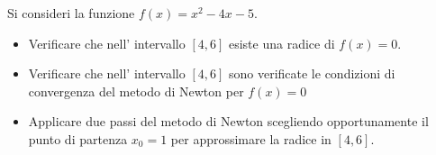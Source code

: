 Si consideri la funzione $f(x)=x^2-4x-5$.
\begin{itemize}
\item  Verificare che nell' intervallo $[4, 6]$ esiste una radice di $f(x)=0.$
\item
Verificare che nell' intervallo  $[4, 6]$ sono verificate le condizioni di convergenza del metodo di Newton per $f(x)=0$
\item
Applicare
due passi del metodo di Newton scegliendo opportunamente il punto di partenza $x_0=1$ per approssimare la radice in $[4, 6].$ 
\end{itemize}
